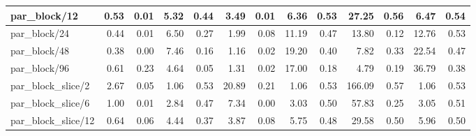 \begin{table}[H]
\begin{tabular}{|lllllllllllll|}
		\multicolumn{1}{|l|}{par\_block/12}  & \multicolumn{1}{r|}{0.53} & \multicolumn{1}{r|}{0.01} & \multicolumn{1}{r|}{5.32} & \multicolumn{1}{r|}{0.44}  & \multicolumn{1}{r|}{3.49} & \multicolumn{1}{r|}{0.01} & \multicolumn{1}{r|}{6.36} & \multicolumn{1}{r|}{0.53}  & \multicolumn{1}{r|}{27.25} & \multicolumn{1}{r|}{0.56} & \multicolumn{1}{r|}{6.47} & \multicolumn{1}{r|}{0.54}  \\ \hline
		\multicolumn{1}{|l|}{par\_block/24}  & \multicolumn{1}{r|}{0.44} & \multicolumn{1}{r|}{0.01} & \multicolumn{1}{r|}{6.50} & \multicolumn{1}{r|}{0.27}  & \multicolumn{1}{r|}{1.99} & \multicolumn{1}{r|}{0.08} & \multicolumn{1}{r|}{11.19} & \multicolumn{1}{r|}{0.47}  & \multicolumn{1}{r|}{13.80} & \multicolumn{1}{r|}{0.12} & \multicolumn{1}{r|}{12.76} & \multicolumn{1}{r|}{0.53}  \\ \hline
		\multicolumn{1}{|l|}{par\_block/48}  & \multicolumn{1}{r|}{0.38} & \multicolumn{1}{r|}{0.00} & \multicolumn{1}{r|}{7.46} & \multicolumn{1}{r|}{0.16}  & \multicolumn{1}{r|}{1.16} & \multicolumn{1}{r|}{0.02} & \multicolumn{1}{r|}{19.20} & \multicolumn{1}{r|}{0.40}  & \multicolumn{1}{r|}{7.82} & \multicolumn{1}{r|}{0.33} & \multicolumn{1}{r|}{22.54} & \multicolumn{1}{r|}{0.47}  \\ \hline
		\multicolumn{1}{|l|}{par\_block/96}  & \multicolumn{1}{r|}{0.61} & \multicolumn{1}{r|}{0.23} & \multicolumn{1}{r|}{4.64} & \multicolumn{1}{r|}{0.05}  & \multicolumn{1}{r|}{1.31} & \multicolumn{1}{r|}{0.02} & \multicolumn{1}{r|}{17.00} & \multicolumn{1}{r|}{0.18}  & \multicolumn{1}{r|}{4.79} & \multicolumn{1}{r|}{0.19} & \multicolumn{1}{r|}{36.79} & \multicolumn{1}{r|}{0.38}  \\ \hline
		\multicolumn{1}{|l|}{par\_block\_slice/2}  & \multicolumn{1}{r|}{2.67} & \multicolumn{1}{r|}{0.05} & \multicolumn{1}{r|}{1.06} & \multicolumn{1}{r|}{0.53}  & \multicolumn{1}{r|}{20.89} & \multicolumn{1}{r|}{0.21} & \multicolumn{1}{r|}{1.06} & \multicolumn{1}{r|}{0.53}  & \multicolumn{1}{r|}{166.09} & \multicolumn{1}{r|}{0.57} & \multicolumn{1}{r|}{1.06} & \multicolumn{1}{r|}{0.53}  \\ \hline
		\multicolumn{1}{|l|}{par\_block\_slice/6}  & \multicolumn{1}{r|}{1.00} & \multicolumn{1}{r|}{0.01} & \multicolumn{1}{r|}{2.84} & \multicolumn{1}{r|}{0.47}  & \multicolumn{1}{r|}{7.34} & \multicolumn{1}{r|}{0.00} & \multicolumn{1}{r|}{3.03} & \multicolumn{1}{r|}{0.50}  & \multicolumn{1}{r|}{57.83} & \multicolumn{1}{r|}{0.25} & \multicolumn{1}{r|}{3.05} & \multicolumn{1}{r|}{0.51}  \\ \hline
		\multicolumn{1}{|l|}{par\_block\_slice/12}  & \multicolumn{1}{r|}{0.64} & \multicolumn{1}{r|}{0.06} & \multicolumn{1}{r|}{4.44} & \multicolumn{1}{r|}{0.37}  & \multicolumn{1}{r|}{3.87} & \multicolumn{1}{r|}{0.08} & \multicolumn{1}{r|}{5.75} & \multicolumn{1}{r|}{0.48}  & \multicolumn{1}{r|}{29.58} & \multicolumn{1}{r|}{0.50} & \multicolumn{1}{r|}{5.96} & \multicolumn{1}{r|}{0.50}  \\ \hline

\end{tabular}
\end{table}

